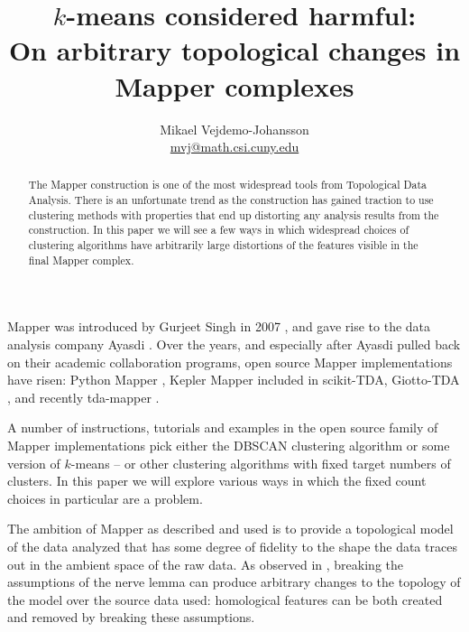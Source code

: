 \documentclass{amsart}
\title{$k$-means considered harmful:\\On arbitrary topological changes in Mapper complexes}
\author[1,2]{Mikael Vejdemo-Johansson \\ \url{mvj@math.csi.cuny.edu}}
\affil[1]{Department of Mathematics, CUNY College of Staten Island}
\affil[2]{Computer Science; Data Science; Mathematics, CUNY Graduate Center}
\begin{document}
\maketitle



\begin{abstract}
The Mapper construction is one of the most widespread tools from Topological Data Analysis.
There is an unfortunate trend as the construction has gained traction to use clustering methods with properties that end up distorting any analysis results from the construction.
In this paper we will see a few ways in which widespread choices of clustering algorithms have arbitrarily large distortions of the features visible in the final Mapper complex.
\end{abstract}



\clearpage


Mapper was introduced by Gurjeet Singh in 2007 \cite{singh2007topological}, and gave rise to the data analysis company Ayasdi \cite{lum2013extracting}.
Over the years, and especially after Ayasdi pulled back on their academic collaboration programs, open source Mapper implementations have risen: Python Mapper \cite{mullner2013pymapper}, Kepler Mapper \cite{KeplerMapper_JOSS} included in scikit-TDA, Giotto-TDA \cite{tauzin2020giottotda}, and recently tda-mapper \cite{simi_2024_14194667}.

A number of instructions, tutorials and examples in the open source family of Mapper implementations pick either the DBSCAN clustering algorithm or some version of $k$-means -- or other clustering algorithms with fixed target numbers of clusters. In this paper we will explore various ways in which the fixed count choices in particular are a problem.

The ambition of Mapper as described and used is to provide a topological model of the data analyzed that has some degree of fidelity to the shape the data traces out in the ambient space of the raw data.
As observed in \cite{vejdemo2020certified}, breaking the assumptions of the nerve lemma can produce arbitrary changes to the topology of the model over the source data used: homological features can be both created and removed by breaking these assumptions.
\end{document}
